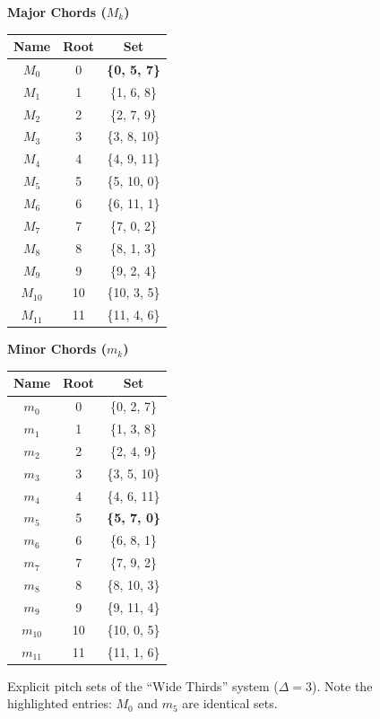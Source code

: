 \documentclass[12pt,letterpaper]{amsart}
\begin{document}
\begin{figure}[H]
  \centering
\scriptsize
    \renewcommand{\arraystretch}{1.1}
\begin{minipage}{0.45\textwidth}
\centering
\textbf{Major Chords ($M_k$)}\\
\begin{tabular}{ccc}
\toprule
Name & Root & \textbf{Set} \\
\midrule
$M_0$ & 0 & \textbf{\{0, 5, 7\}} \\
$M_1$ & 1 & \{1, 6, 8\} \\
$M_2$ & 2 & \{2, 7, 9\} \\
$M_3$ & 3 & \{3, 8, 10\} \\
$M_4$ & 4 & \{4, 9, 11\} \\
$M_5$ & 5 & \{5, 10, 0\} \\
$M_6$ & 6 & \{6, 11, 1\} \\
$M_7$ & 7 & \{7, 0, 2\} \\
$M_8$ & 8 & \{8, 1, 3\} \\
$M_9$ & 9 & \{9, 2, 4\} \\
$M_{10}$ & 10 & \{10, 3, 5\} \\
$M_{11}$ & 11 & \{11, 4, 6\} \\
\bottomrule
\end{tabular}
\end{minipage}
\hfill
\begin{minipage}{0.45\textwidth}
\centering
\textbf{Minor Chords ($m_k$)}\\
\begin{tabular}{ccc}
\toprule
Name & Root & \textbf{Set} \\
\midrule
$m_0$ & 0 & \{0, 2, 7\} \\
$m_1$ & 1 & \{1, 3, 8\} \\
$m_2$ & 2 & \{2, 4, 9\} \\
$m_3$ & 3 & \{3, 5, 10\} \\
$m_4$ & 4 & \{4, 6, 11\} \\
$m_5$ & 5 & \textbf{\{5, 7, 0\}} \\
$m_6$ & 6 & \{6, 8, 1\} \\
$m_7$ & 7 & \{7, 9, 2\} \\
$m_8$ & 8 & \{8, 10, 3\} \\
$m_9$ & 9 & \{9, 11, 4\} \\
$m_{10}$ & 10 & \{10, 0, 5\} \\
$m_{11}$ & 11 & \{11, 1, 6\} \\
\bottomrule
\end{tabular}
\end{minipage}
\caption{\scriptsize Explicit pitch sets of the ``Wide Thirds'' system ($\Delta=3$). Note the highlighted entries: $M_0$ and $m_5$ are identical sets.}
\label{fig:chords_delta3_explicit}
\end{figure}
\end{document}
